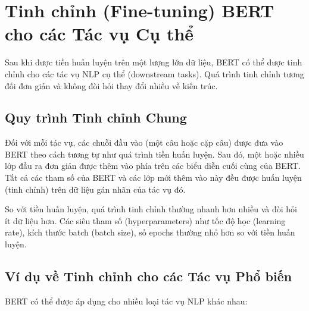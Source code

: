 \section{Tinh chỉnh (Fine-tuning) BERT cho các Tác vụ Cụ thể}
\label{sec:fine_tuning_bert}
Sau khi được tiền huấn luyện trên một lượng lớn dữ liệu, BERT có thể được tinh chỉnh cho các tác vụ NLP cụ thể (downstream tasks). Quá trình tinh chỉnh tương đối đơn giản và không đòi hỏi thay đổi nhiều về kiến trúc.

\subsection{Quy trình Tinh chỉnh Chung}
\label{ssec:quy_trinh_tinh_chinh}
Đối với mỗi tác vụ, các chuỗi đầu vào (một câu hoặc cặp câu) được đưa vào BERT theo cách tương tự như quá trình tiền huấn luyện. Sau đó, một hoặc nhiều lớp đầu ra đơn giản được thêm vào phía trên các biểu diễn cuối cùng của BERT. Tất cả các tham số của BERT và các lớp mới thêm vào này đều được huấn luyện (tinh chỉnh) trên dữ liệu gán nhãn của tác vụ đó.

So với tiền huấn luyện, quá trình tinh chỉnh thường nhanh hơn nhiều và đòi hỏi ít dữ liệu hơn. Các siêu tham số (hyperparameters) như tốc độ học (learning rate), kích thước batch (batch size), số epochs thường nhỏ hơn so với tiền huấn luyện.

\subsection{Ví dụ về Tinh chỉnh cho các Tác vụ Phổ biến}
\label{ssec:vi_du_tinh_chinh}
BERT có thể được áp dụng cho nhiều loại tác vụ NLP khác nhau:

